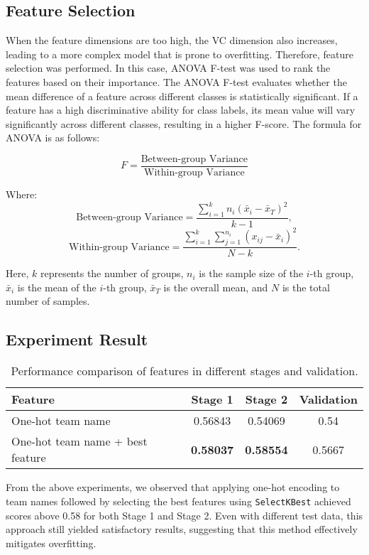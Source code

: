 \documentclass[12pt,a4paper]{article}
\begin{document}

\subsection{Feature Selection}  

When the feature dimensions are too high, the VC dimension also increases, leading to a more complex model that is prone to overfitting. Therefore, feature selection was performed. In this case, ANOVA F-test was used to rank the features based on their importance. The ANOVA F-test evaluates whether the mean difference of a feature across different classes is statistically significant. If a feature has a high discriminative ability for class labels, its mean value will vary significantly across different classes, resulting in a higher F-score. The formula for ANOVA is as follows:

\[
F = \frac{\text{Between-group Variance}}{\text{Within-group Variance}}
\]

Where:
\[
\text{Between-group Variance} = \frac{\sum_{i=1}^{k} n_i (\bar{x}_i - \bar{x}_T)^2}{k-1},
\]
\[
\text{Within-group Variance} = \frac{\sum_{i=1}^{k} \sum_{j=1}^{n_i} (x_{ij} - \bar{x}_i)^2}{N-k}.
\]

Here, \( k \) represents the number of groups, \( n_i \) is the sample size of the \( i \)-th group, \( \bar{x}_i \) is the mean of the \( i \)-th group, \( \bar{x}_T \) is the overall mean, and \( N \) is the total number of samples.

\subsection{Experiment Result}  

\begin{table}[h!]
\centering
\begin{tabular}{lccc}
\toprule
\textbf{Feature} & \textbf{Stage 1} & \textbf{Stage 2} & \textbf{Validation} \\ 
\midrule
One-hot team name & 0.56843 & 0.54069 & 0.54 \\ 
One-hot team name + best feature & \textbf{0.58037} & \textbf{0.58554} & 0.5667 \\ 
\bottomrule
\end{tabular}
\caption{Performance comparison of features in different stages and validation.}
\label{tab:final_results}
\end{table}

From the above experiments, we observed that applying one-hot encoding to team names followed by selecting the best features using \texttt{SelectKBest} achieved scores above 0.58 for both Stage 1 and Stage 2. Even with different test data, this approach still yielded satisfactory results, suggesting that this method effectively mitigates overfitting.
\end{document}
